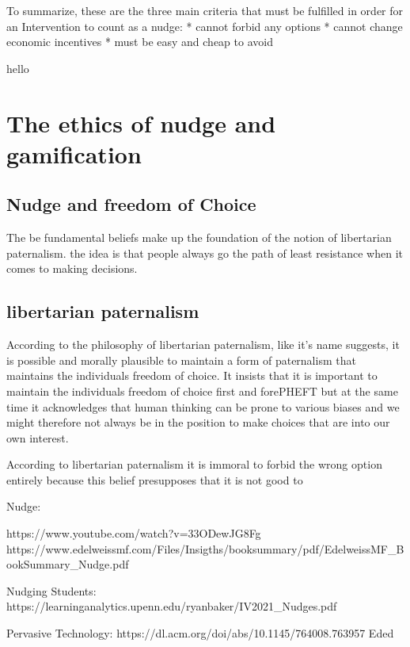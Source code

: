 To  summarize, these are the three main criteria that must be fulfilled in order for an Intervention to count as a nudge:
* cannot forbid any options
* cannot change economic incentives
* must be easy and cheap to avoid

hello
\section{The ethics of nudge and gamification}

\subsection{Nudge and freedom of Choice}
The be fundamental beliefs make up the foundation of the notion of libertarian paternalism.
the idea is that people always go the path of least resistance when it comes to making  decisions.

\subsection{libertarian paternalism}
According to the  philosophy of libertarian paternalism, like it's name suggests, it is possible and morally plausible to maintain a form of paternalism that maintains the individuals freedom of choice. It insists that it is important to maintain the individuals freedom of choice first and forePHEFT but at the same time it acknowledges that human thinking can be prone to  various biases and we might therefore not always be in the position to make choices that are into our own interest.


According to libertarian paternalism it is immoral to  forbid the wrong option entirely because this belief presupposes that it is not good to



Nudge:

https://www.youtube.com/watch?v=33ODewJG8Fg
https://www.edelweissmf.com/Files/Insigths/booksummary/pdf/EdelweissMF_BookSummary_Nudge.pdf

Nudging Students:
https://learninganalytics.upenn.edu/ryanbaker/IV2021_Nudges.pdf


Pervasive Technology:
https://dl.acm.org/doi/abs/10.1145/764008.763957
Eded